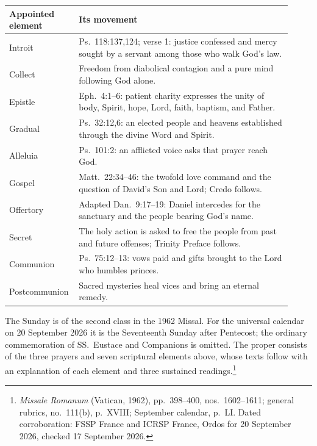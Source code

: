 \begin{longtable}{>{\raggedright\arraybackslash}p{0.19\linewidth}>{\raggedright\arraybackslash}p{0.73\linewidth}}
\toprule
\textbf{Appointed element} & \textbf{Its movement}\\ \midrule
\endhead
Introit & Ps.~118:137,124; verse 1: justice confessed and mercy sought by a servant among those who walk God's law.\\
Collect & Freedom from diabolical contagion and a pure mind following God alone.\\
Epistle & Eph.~4:1--6: patient charity expresses the unity of body, Spirit, hope, Lord, faith, baptism, and Father.\\
Gradual & Ps.~32:12,6: an elected people and heavens established through the divine Word and Spirit.\\
Alleluia & Ps.~101:2: an afflicted voice asks that prayer reach God.\\
Gospel & Matt.~22:34--46: the twofold love command and the question of David's Son and Lord; Credo follows.\\
Offertory & Adapted Dan.~9:17--19: Daniel intercedes for the sanctuary and the people bearing God's name.\\
Secret & The holy action is asked to free the people from past and future offenses; Trinity Preface follows.\\
Communion & Ps.~75:12--13: vows paid and gifts brought to the Lord who humbles princes.\\
Postcommunion & Sacred mysteries heal vices and bring an eternal remedy.\\
\bottomrule
\end{longtable}

The Sunday is of the second class in the 1962 Missal. For the universal calendar on 20 September 2026 it is the Seventeenth Sunday after Pentecost; the ordinary commemoration of SS.~Eustace and Companions is omitted. The proper consists of the three prayers and seven scriptural elements above, whose texts follow with an explanation of each element and three sustained readings.\footnote{\textit{Missale Romanum} (Vatican, 1962), pp.~398--400, nos.~1602--1611; general rubrics, no.~111(b), p.~XVIII; September calendar, p.~LI. Dated corroboration: FSSP France and ICRSP France, Ordos for 20 September 2026, checked 17 September 2026.}

\tableofcontents
